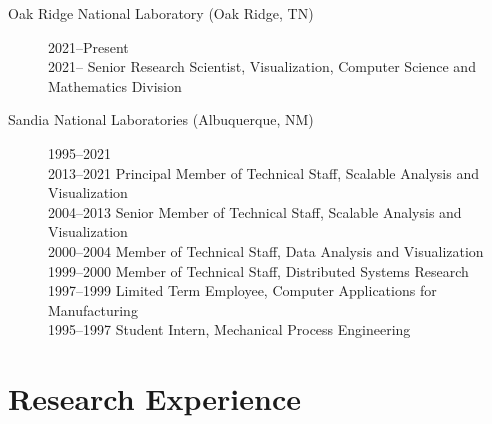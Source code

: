 \documentclass{article}
\begin{document}
\begin{description}
\item[Oak Ridge National Laboratory (Oak Ridge, TN)]\hfill 2021--Present\\
  2021-- Senior Research Scientist, Visualization, Computer Science and Mathematics Division

\item[Sandia National Laboratories (Albuquerque, NM)]\hfill 1995--2021\\
  2013--2021 Principal Member of Technical Staff, Scalable Analysis and Visualization\\
  2004--2013 Senior Member of Technical Staff, Scalable Analysis and Visualization\\
  2000--2004 Member of Technical Staff, Data Analysis and Visualization\\
  1999--2000 Member of Technical Staff, Distributed Systems Research\\
  1997--1999 Limited Term Employee, Computer Applications for Manufacturing\\
  1995--1997 Student Intern, Mechanical Process Engineering
\end{description}


\section*{Research Experience}
\end{document}
